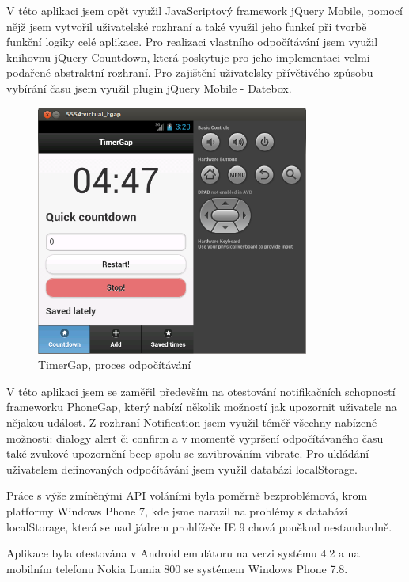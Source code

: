 V této aplikaci jsem opět využil JavaScriptový framework jQuery Mobile, pomocí nějž jsem vytvořil uživatelské rozhraní a také využil jeho funkcí při tvorbě funkční logiky celé aplikace. Pro realizaci vlastního odpočítávání jsem využil knihovnu jQuery Countdown, která poskytuje pro jeho implementaci velmi podařené abstraktní rozhraní. Pro zajištění uživatelsky přívětivého způsobu vybírání času jsem využil plugin jQuery Mobile - Datebox.

\begin{figure}[htbp]\centering
\includegraphics[width=0.8\textwidth]{tgap_odpocitavani.png}
\caption{TimerGap, proces odpočítávání}
\label{fig:TGapOdpocitavani}
\end{figure}

V této aplikaci jsem se zaměřil především na otestování notifikačních schopností frameworku PhoneGap, který nabízí několik možností jak upozornit uživatele na nějakou událost. Z rozhraní Notification  jsem využil téměř všechny nabízené možnosti: dialogy alert či confirm a v momentě vypršení odpočítávaného času také zvukové upozornění beep spolu se zavibrováním vibrate. Pro ukládání uživatelem definovaných odpočítávání jsem využil databázi localStorage.

Práce s výše zmíněnými API voláními byla poměrně bezproblémová, krom platformy Windows Phone 7, kde jsme narazil na problémy s databází localStorage, která se nad jádrem prohlížeče IE 9 chová poněkud nestandardně.
        
Aplikace byla otestována v Android emulátoru na verzi systému 4.2 a na mobilním telefonu Nokia Lumia 800 se systémem Windows Phone 7.8.